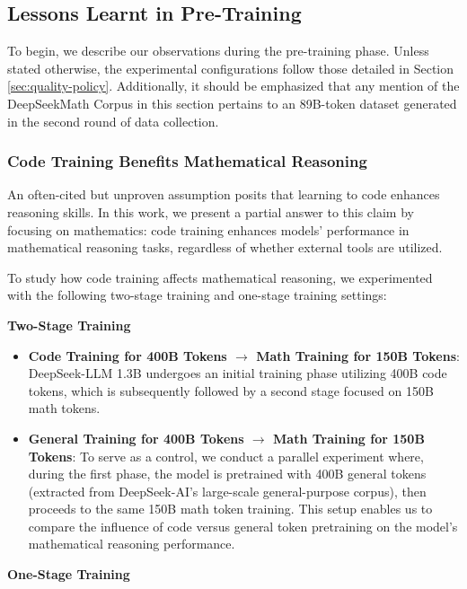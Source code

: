 \begin{itemize}[topsep=0pt]
\begin{itemize}[topsep=0pt]
\subsection{Lessons Learnt in Pre-Training}

To begin, we describe our observations during the pre-training phase. Unless stated otherwise, the experimental configurations follow those detailed in Section \ref{sec:quality-policy}. Additionally, it should be emphasized that any mention of the DeepSeekMath Corpus in this section pertains to an 89B-token dataset generated in the second round of data collection.

\subsubsection{Code Training Benefits Mathematical Reasoning}

An often-cited but unproven assumption posits that learning to code enhances reasoning skills. In this work, we present a partial answer to this claim by focusing on mathematics: code training enhances models' performance in mathematical reasoning tasks, regardless of whether external tools are utilized.

To study how code training affects mathematical reasoning, we experimented with the following two-stage training and one-stage training settings:

\textbf{Two-Stage Training}

\begin{itemize}[topsep=0pt]
    \item \textbf{Code Training for 400B Tokens $\rightarrow$ Math Training for 150B Tokens}: DeepSeek-LLM 1.3B undergoes an initial training phase utilizing 400B code tokens, which is subsequently followed by a second stage focused on 150B math tokens.
    \item \textbf{General Training for 400B Tokens $\rightarrow$ Math Training for 150B Tokens}: To serve as a control, we conduct a parallel experiment where, during the first phase, the model is pretrained with 400B general tokens (extracted from DeepSeek-AI’s large-scale general-purpose corpus), then proceeds to the same 150B math token training. This setup enables us to compare the influence of code versus general token pretraining on the model’s mathematical reasoning performance.
\end{itemize}

\textbf{One-Stage Training}


\end{itemize}
\end{itemize}
